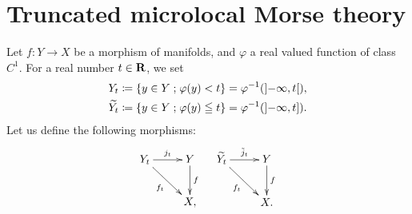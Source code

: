 \section{Truncated microlocal Morse theory}

Let \(f\colon Y\to X\) be a morphism of manifolds, and 
\(\varphi\) a real valued function of class \(C^1\). 
For a real number \(t\in \mathbf{R}\), we set 
\begin{align*}
  Y_t
  &\coloneqq \left\{y\in Y\mathrel{;} \varphi(y)< t\right\} 
  = \varphi^{-1}(\mathopen{]}-\infty,t\mathclose{[}),\\
  \widetilde{Y_t}
  &\coloneqq \left\{y\in Y\mathrel{;} \varphi(y)\leqq t\right\} 
  = \varphi^{-1}(\mathopen{]}-\infty,t\mathopen{]}).
\end{align*}
Let us define the following morphisms:
\[\xymatrix{
  Y_t\ar[r]^-{j_t}
  \ar[rd]_-{f_t}
  &
  Y
  \ar[d]^-{f}\\
  &X,
}\quad\xymatrix{
  \widetilde{Y_t}\ar[r]^-{\tilde{j}_t}
  \ar[rd]_-{f_t}
  &
  Y
  \ar[d]^-{f}\\
  &X.
}\]

